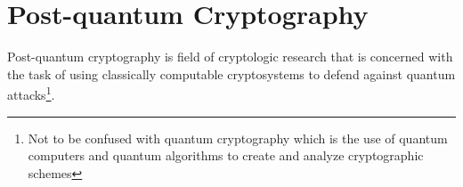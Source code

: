 \section{Post-quantum Cryptography}

Post-quantum cryptography is field of cryptologic research that is concerned with the task of using classically computable cryptosystems to defend against quantum attacks\footnote{Not to be confused with quantum cryptography which is the use of quantum computers and quantum algorithms to create and analyze cryptographic schemes}. 